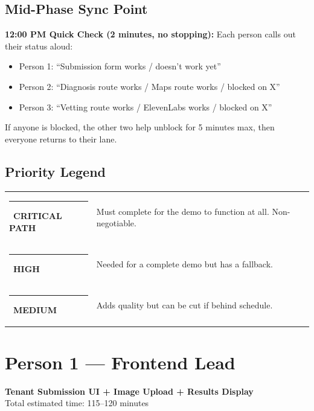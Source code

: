 \documentclass[11pt, a4paper]{article}
\newcommand{\critical}{\textcolor{critred}{\rule{6pt}{6pt}}~\textcolor{critred}{\scriptsize\textbf{CRITICAL PATH}}}
\newcommand{\highpri}{\textcolor{highamber}{\rule{6pt}{6pt}}~\textcolor{highamber}{\scriptsize\textbf{HIGH}}}
\newcommand{\medpri}{\textcolor{medgreen}{\rule{6pt}{6pt}}~\textcolor{medgreen}{\scriptsize\textbf{MEDIUM}}}
\begin{document}
\subsection{Mid-Phase Sync Point}

\begin{syncbox}
\textbf{12:00 PM Quick Check (2 minutes, no stopping):} Each person calls out their status aloud:
\begin{itemize}[itemsep=1pt, leftmargin=1.5em]
  \item Person 1: ``Submission form works / doesn't work yet''
  \item Person 2: ``Diagnosis route works / Maps route works / blocked on X''
  \item Person 3: ``Vetting route works / ElevenLabs works / blocked on X''
\end{itemize}
If anyone is blocked, the other two help unblock for 5 minutes max, then everyone returns to their lane.
\end{syncbox}

\subsection{Priority Legend}

\begin{tabularx}{\textwidth}{lX}
\critical & Must complete for the demo to function at all. Non-negotiable. \\[4pt]
\highpri & Needed for a complete demo but has a fallback. \\[4pt]
\medpri & Adds quality but can be cut if behind schedule. \\
\end{tabularx}

\newpage

\section{Person 1 --- Frontend Lead}
\begin{center}
\textcolor{medblue}{\large\textbf{Tenant Submission UI + Image Upload + Results Display}}\\[2pt]
\textcolor{textmuted}{\small Total estimated time: 115--120 minutes}
\end{center}

\vspace{0.5em}
\end{document}
